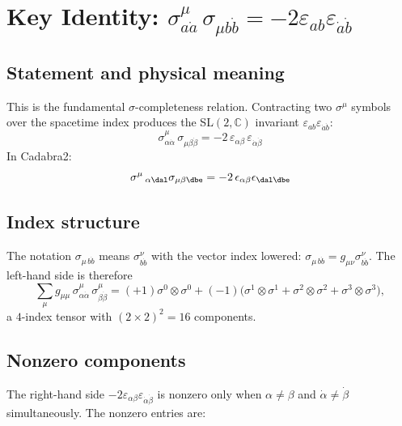 \documentclass[12pt]{article}
\begin{document}
\section{Key Identity: \texorpdfstring{$\sigma^\mu_{a\dot{a}}\,\sigma_{\mu b\dot{b}}
         = -2\varepsilon_{ab}\varepsilon_{\dot{a}\dot{b}}$}{eq 35.4}
         \quad [eq.~35.4]}

\subsection{Statement and physical meaning}

This is the fundamental $\sigma$-completeness relation.  Contracting
two $\sigma^\mu$ symbols over the spacetime index produces the
SL$(2,\mathbb{C})$ invariant $\varepsilon_{ab}\varepsilon_{\dot{a}\dot{b}}$:
\begin{equation}
  \boxed{
    \sigma^\mu_{\alpha\dot{\alpha}}\,\sigma_{\mu\beta\dot{\beta}}
    = -2\,\varepsilon_{\alpha\beta}\,\varepsilon_{\dot{\alpha}\dot{\beta}}
  }
  \tag{35.4}
\end{equation}
In Cadabra2:
\[
  \sigma^{\mu}\,_{\alpha \dal} \sigma_{\mu \beta \dbe} = -2\,\epsilon_{\alpha \beta} \epsilon_{\dal \dbe}
\]

\subsection{Index structure}

The notation $\sigma_{\mu\,b\dot{b}}$ means $\sigma^\nu_{b\dot{b}}$ with
the vector index lowered: $\sigma_{\mu\,b\dot{b}} = g_{\mu\nu}\sigma^\nu_{b\dot{b}}$.
The left-hand side is therefore
\[
  \sum_\mu g_{\mu\mu}\,\sigma^\mu_{\alpha\dot{\alpha}}\,\sigma^\mu_{\beta\dot{\beta}}
  = (+1)\sigma^0\!\otimes\!\sigma^0
    + (-1)\bigl(\sigma^1\!\otimes\!\sigma^1
    + \sigma^2\!\otimes\!\sigma^2
    + \sigma^3\!\otimes\!\sigma^3\bigr),
\]
a $4$-index tensor with $(2\times2)^2 = 16$ components.

\subsection{Nonzero components}

The right-hand side $-2\varepsilon_{\alpha\beta}\varepsilon_{\dot\alpha\dot\beta}$
is nonzero only when $\alpha\neq\beta$ and $\dot\alpha\neq\dot\beta$
simultaneously.  The nonzero entries are:
\end{document}

